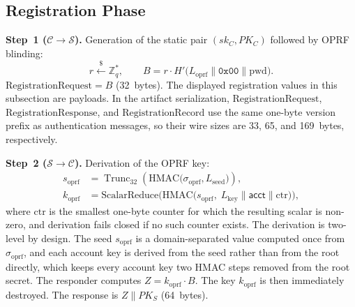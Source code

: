 \documentclass[preprint,12pt]{elsarticle}
\newcommand{\acct}{\mathsf{acct}}
\newcommand{\sigoprf}{\sigma_{\mathrm{oprf}}}
\newcommand{\Label}[1]{L_{\mathrm{#1}}}
\theoremstyle{remark}
\begin{document}
\subsection{Registration Phase}

\textbf{Step~1 ($\mathcal{C} \to \mathcal{S}$).} Generation of the
static pair $(sk_C, PK_C)$ followed by OPRF blinding:
\begin{equation}
  r \xleftarrow{\$} \mathbb{Z}_q^*, \qquad
  B = r \cdot H'\!\bigl(\Label{oprf} \| \mathtt{0x00} \| \mathrm{pwd}\bigr).
  \label{eq:reg-blind}
\end{equation}
$\mathrm{RegistrationRequest} = B$ (32~bytes).
The displayed registration values in this subsection are payloads. In the
artifact serialization, $\mathrm{RegistrationRequest}$,
$\mathrm{RegistrationResponse}$, and $\mathrm{RegistrationRecord}$ use the
same one-byte version prefix as authentication messages, so their wire
sizes are 33, 65, and 169~bytes, respectively.

\textbf{Step~2 ($\mathcal{S} \to \mathcal{C}$).} Derivation of the OPRF
key:
\begin{align}
  s_{\mathrm{oprf}}
    &= \operatorname{Trunc}_{32}\!\left(
      \mathrm{HMAC}\!\bigl(\sigoprf, \Label{seed}\bigr)\right),
    \\
  k_{\mathrm{oprf}}
    &= \mathrm{ScalarReduce}\!\bigl(
      \mathrm{HMAC}\!\bigl(
        s_{\mathrm{oprf}},\;
        \Label{key} \| \acct \| \mathrm{ctr}
      \bigr)\bigr),
    \label{eq:oprf-key}
\end{align}
where $\mathrm{ctr}$ is the smallest one-byte counter for which the resulting
scalar is non-zero, and derivation fails closed if no such counter exists.
The derivation is two-level by design. The seed
$s_{\mathrm{oprf}}$ is a domain-separated value computed once from $\sigoprf$,
and each account key is derived from the seed rather than from the root
directly, which keeps every account key two HMAC steps removed from the root
secret. The responder computes
$Z = k_{\mathrm{oprf}} \cdot B$. The key $k_{\mathrm{oprf}}$ is then
immediately destroyed. The response is
$Z \| PK_S$ (64~bytes).
\end{document}
